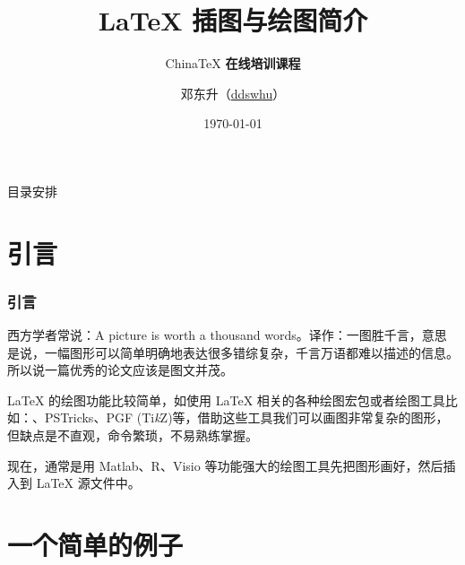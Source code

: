 \documentclass[10pt]{beamer}
\numberwithin{figure}{section}
\newcommand{\TIKZ}{Ti\textit{k}Z}
\begin{document}
\title[\LaTeX{} 插图与绘图简介]{ \LaTeX{} \bfseries 插图与绘图简介}
\subtitle{China\TeX{} \bfseries 在线培训课程}
\author[ddswhu]{\small\sffamily 邓东升（\href{http://ddswhu.com/}{ddswhu}） \\{\color{erlangenblue}}}
\date{\today}

\begin{frame}[plain]
\titlepage
\end{frame}


\begin{frame}{目录安排}
  \tableofcontents
\end{frame}
\section{引言}
\begin{frame}[c]\frametitle{引言}

西方学者常说：A picture is worth a thousand words。译作：一图胜千言，意思是说，一幅图形可以简单明确地表达很多错综复杂，千言万语都难以描述的信息。所以说一篇优秀的论文应该是图文并茂。

\LaTeX{} 的绘图功能比较简单，如使用 \LaTeX{} 相关的各种绘图宏包或者绘图工具比如：\MP、PSTricks、PGF (\TIKZ)等，借助这些工具我们可以画图非常复杂的图形，但缺点是不直观，命令繁琐，不易熟练掌握。

现在，通常是用 Matlab、R、Visio 等功能强大的绘图工具先把图形画好，然后插入到 \LaTeX{} 源文件中。

\end{frame}

\section[例子]{一个简单的例子}
\end{document}
